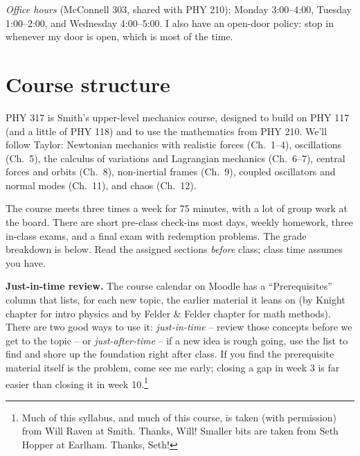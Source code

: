 \textit{Office hours} (McConnell 303, shared with PHY 210): Monday
3:00--4:00, Tuesday 1:00--2:00, and Wednesday 4:00--5:00. I also have an
open-door policy: stop in whenever my door is open, which is most of the
time.

\vspace{.25cm}

\section{Course structure}
%
PHY 317 is Smith's upper-level mechanics course, designed to build on PHY 117
(and a little of PHY 118) and to use the mathematics from PHY 210. We'll follow
Taylor: Newtonian mechanics with realistic forces (Ch.\ 1--4), oscillations (Ch.\
5), the calculus of variations and Lagrangian mechanics (Ch.\ 6--7), central
forces and orbits (Ch.\ 8), non-inertial frames (Ch.\ 9), coupled oscillators
and normal modes (Ch.\ 11), and chaos (Ch.\ 12).

\medskip
The course meets three times a week for 75 minutes, with a lot of group
work at the board. There are short pre-class check-ins most days, weekly
homework, three in-class exams, and a final exam with redemption
problems. The grade breakdown is below. Read the assigned sections
\emph{before} class; class time assumes you have.

\medskip \textbf{Just-in-time review.} The course calendar on Moodle has a
``Prerequisites'' column that lists, for each new topic, the earlier material it
leans on (by Knight chapter for intro physics and by Felder \& Felder chapter
for math methods). There are two good ways to use it: \emph{just-in-time} --
review those concepts before we get to the topic -- or \emph{just-after-time} --
if a new idea is rough going, use the list to find and shore up the foundation
right after class. If you find the prerequisite material itself is the problem,
come see me early; closing a gap in week 3 is far easier than closing it in week
10.\footnote{Much of this syllabus, and much of this course, is taken (with
  permission) from Will Raven at Smith. Thanks, Will! Smaller bits are taken from Seth
  Hopper at Earlham. Thanks, Seth!}

\bigskip

